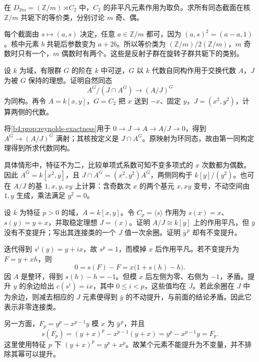 \begin{exercise}\label{b4:ex:11-dihedral-complements}
在 \(D_{2m}=(\mathbb Z/m)\rtimes C_2\) 中，\(C_2\) 的非平凡元素作用为取负。求所有同态截面在核 \(\mathbb Z/m\) 共轭下的等价类，分别讨论 \(m\) 奇、偶。
\end{exercise}
\begin{solution}
每个截面由 \(s\mapsto(a,s)\) 决定，任意 \(a\in\mathbb Z/m\) 都可，因为 \((a,s)^2=(a-a,1)\)。核中元素 \(b\) 共轭后参数变为 \(a+2b\)。所以等价类为 \((\mathbb Z/m)/2(\mathbb Z/m)\)，\(m\) 奇数时只有一个，\(m\) 偶数时有两个。这些是反射子群在旋转子群共轭下的类别。
\end{solution}

\begin{exercise}\label{b4:ex:11-invariant-quotient}
设 \(k\) 为域，有限群 \(G\) 的阶在 \(k\) 中可逆，\(G\) 以 \(k\) 代数自同构作用于交换代数 \(A\)，\(J\) 为被 \(G\) 保持的理想。证明自然同态
\[
A^G/(J\cap A^G)\longrightarrow(A/J)^G
\]
为同构。再令 \(A=k[x,y]\)，\(G=C_2\) 把 \(x\) 送到 \(-x\)、固定 \(y\)，\(J=(x^2,y^2)\)，计算两侧的代数。
\end{exercise}
\begin{solution}
将\cref{b4:prop:reynolds-exactness}用于 \(0\to J\to A\to A/J\to0\)，得到 \(A^G\to(A/J)^G\) 满射；其核按定义是 \(J\cap A^G\)。原映射为环同态，故由第一同构定理得到所求代数同构。

具体情形中，特征不为二，比较单项式系数可知不变多项式的 \(x\) 次数都为偶数。因此 \(A^G=k[x^2,y]\)，且 \(J\cap A^G=(x^2,y^2)A^G\)，两侧同构于 \(k[y]/(y^2)\)。也可在 \(A/J\) 的基 \(1,x,y,xy\) 上计算：含奇数次 \(x\) 的两个基元 \(x,xy\) 变号，不动空间由 \(1,y\) 生成，乘法满足 \(y^2=0\)。
\end{solution}

\begin{exercise}\label{b4:ex:11-modular-polynomial-lift}
设 \(k\) 为特征 \(p>0\) 的域，\(A=k[x,y]\)。令 \(C_p=\langle s\rangle\) 作用为 \(s(x)=x\)、\(s(y)=y+x\)，并取稳定理想 \(J=(x)\)。证明 \(A/J\cong k[y]\) 上的作用平凡，但 \(\bar y\) 没有不变提升；写出其连接类的一个 \(J\) 值一次余圈。证明 \(\bar y^{\,p}\) 却有不变提升。
\end{exercise}
\begin{solution}
迭代得到 \(s^i(y)=y+ix\)，故 \(s^p=1\)，而模掉 \(x\) 后作用平凡。若不变提升为 \(F=y+xh\)，则
\[
0=s(F)-F=x\bigl(1+s(h)-h\bigr).
\]
因 \(A\) 是整环，得到 \(s(h)-h=-1\)。但模 \(x\) 后左侧为零、右侧为 \(-1\)，矛盾。提升 \(y\) 的余边给出 \(c(s^i)=ix\)，其中 \(0\le i<p\)，这些值均在 \(J\)。若此余圈在 \(J\) 中为余边，则减去相应的 \(J\) 元素便得到 \(\bar y\) 的不动提升，与前面的结论矛盾。因此它表示非零连接类。

另一方面，\(F_p=y^p-x^{p-1}y\) 模 \(x\) 为 \(\bar y^{\,p}\)，并且
\[
s(F_p)=(y+x)^p-x^{p-1}(y+x)=y^p-x^{p-1}y=F_p.
\]
这里使用特征 \(p\) 下 \((y+x)^p=y^p+x^p\)。故某个元素不能提升为不变量，并不排除其幂可以提升。
\end{solution}

